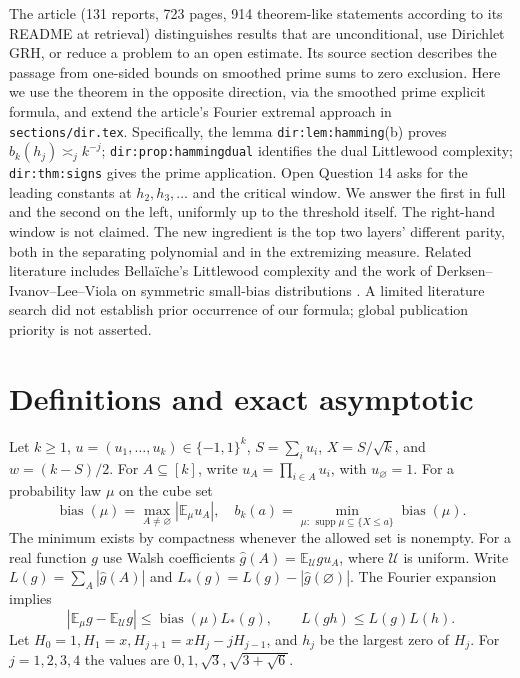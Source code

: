 \documentclass[11pt]{article}
\theoremstyle{remark}\newtheorem{remark}[theorem]{Remark}
\newcommand{\E}{\mathbb E}
\newcommand{\U}{\mathcal U}
\newcommand{\bias}{\operatorname{bias}}
\newcommand{\supp}{\operatorname{supp}}
\begin{document}
The article \cite{article} (131 reports, 723 pages, 914 theorem-like statements according to its README at retrieval) distinguishes results that are unconditional, use Dirichlet GRH, or reduce a problem to an open estimate. Its source section describes the passage from one-sided bounds on smoothed prime sums to zero exclusion. Here we use the theorem in the opposite direction, via the smoothed prime explicit formula, and extend the article's Fourier extremal approach in \texttt{sections/dir.tex}. Specifically, the lemma \texttt{dir:lem:hamming}(b) proves $b_k(h_j)\asymp_j k^{-j}$; \texttt{dir:prop:hammingdual} identifies the dual Littlewood complexity; \texttt{dir:thm:signs} gives the prime application. Open Question 14 asks for the leading constants at $h_2,h_3,\ldots$ and the critical window. We answer the first in full and the second on the left, uniformly up to the threshold itself. The right-hand window is not claimed. The new ingredient is the top two layers' different parity, both in the separating polynomial and in the extremizing measure. Related literature includes Bella\"iche's Littlewood complexity \cite{bellaiche} and the work of Derksen--Ivanov--Lee--Viola on symmetric small-bias distributions \cite{dilv}. A limited literature search did not establish prior occurrence of our formula; global publication priority is not asserted.

\section{Definitions and exact asymptotic}
Let $k\ge1$, $u=(u_1,\ldots,u_k)\in\{-1,1\}^k$, $S=\sum_i u_i$, $X=S/\sqrt{k}$, and $w=(k-S)/2$. For $A\subseteq[k]$, write $u_A=\prod_{i\in A}u_i$, with $u_\varnothing=1$. For a probability law $\mu$ on the cube set
\[
 \bias(\mu)=\max_{A\ne\varnothing}|\E_\mu u_A|,\quad
 b_k(a)=\min_{\mu:\,\supp\mu\subseteq\{X\le a\}}\bias(\mu).
\]
The minimum exists by compactness whenever the allowed set is nonempty. For a real function $g$ use Walsh coefficients $\widehat g(A)=\E_\U g u_A$, where $\U$ is uniform. Write $L(g)=\sum_A|\widehat g(A)|$ and $L_*(g)=L(g)-|\widehat g(\varnothing)|$. The Fourier expansion implies
\begin{equation}\label{eq:dualbound}
 |\E_\mu g-\E_\U g|\le \bias(\mu)L_*(g),\qquad L(gh)\le L(g)L(h).
\end{equation}
Let $H_0=1,H_1=x,H_{j+1}=xH_j-jH_{j-1}$, and $h_j$ be the largest zero of $H_j$. For $j=1,2,3,4$ the values are $0,1,\sqrt3,\sqrt{3+\sqrt6}$.
\end{document}
